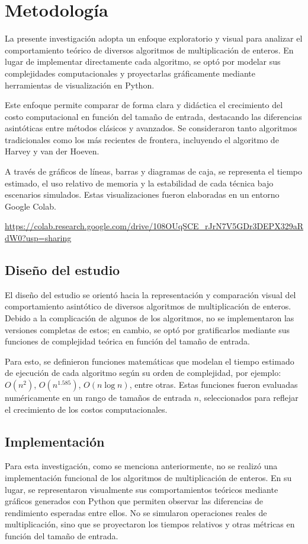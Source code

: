 \chapter{Metodología}
\label{ch:method} %

La presente investigación adopta un enfoque exploratorio y visual para analizar el comportamiento teórico de diversos algoritmos de multiplicación de enteros. En lugar de implementar directamente cada algoritmo, se optó por modelar sus complejidades computacionales y proyectarlas gráficamente mediante herramientas de visualización en Python.

Este enfoque permite comparar de forma clara y didáctica el crecimiento del costo computacional en función del tamaño de entrada, destacando las diferencias asintóticas entre métodos clásicos y avanzados. Se consideraron tanto algoritmos tradicionales como los más recientes de frontera, incluyendo el algoritmo de Harvey y van der Hoeven.

A través de gráficos de líneas, barras y diagramas de caja, se representa el tiempo estimado, el uso relativo de memoria y la estabilidad de cada técnica bajo escenarios simulados. Estas visualizaciones fueron elaboradas en un entorno  Google Colab. 

\url{https://colab.research.google.com/drive/108OUqSCE_rJrN7V5GDr3DEPX329aRdW0?usp=sharing}

\section{Diseño del estudio}
El diseño del estudio se orientó hacia la representación y comparación visual del comportamiento asintótico de diversos algoritmos de multiplicación de enteros. Debido a la complicación de algunos de los algoritmos, no se implementaron las versiones completas de estos; en cambio, se optó por gratificarlos mediante sus funciones de complejidad teórica en función del tamaño de entrada.

Para esto, se definieron funciones matemáticas que modelan el tiempo estimado de ejecución de cada algoritmo según su orden de complejidad, por ejemplo: \( O(n^2) \), \( O(n^{1.585}) \), \( O(n \log n) \), entre otras. Estas funciones fueron evaluadas numéricamente en un rango de tamaños de entrada \( n \), seleccionados para reflejar el crecimiento de los costos computacionales.


\section{Implementación}
Para esta investigación, como se menciona anteriormente, no se realizó una implementación funcional de los algoritmos de multiplicación de enteros. En su lugar, se representaron visualmente sus comportamientos teóricos mediante gráficos generados con Python que permiten observar las diferencias de rendimiento esperadas entre ellos. No se simularon operaciones reales de multiplicación, sino que se proyectaron los tiempos relativos y otras métricas en función del tamaño de entrada.

